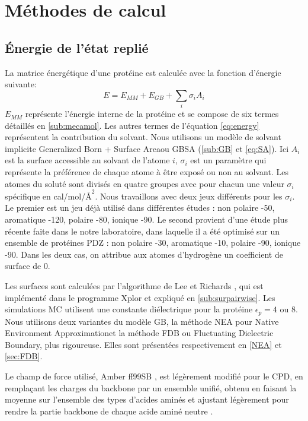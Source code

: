 \section{Méthodes de calcul}
  
\subsection{Énergie de l'état replié}
\label{sec:phia}
La matrice énergétique d'une protéine est calculée avec la fonction d'énergie suivante:
\begin{equation}
  E = E_{MM} + E_{GB} + \sum_i \sigma_iA_i
  \label{eq:energy} 
\end{equation}
$E_{MM}$ représente l'énergie interne de la protéine et se compose de six termes détaillés en \ref{sub:mecamol}. Les autres termes de l'équation \ref{eq:energy} représentent la contribution du solvant. Nous utilisons un modèle de solvant implicite \og Generalized Born + Surface Area\fg ou GBSA (\ref{sub:GB} et \ref{eq:SA}). Ici $A_i$ est la surface accessible au solvant de l'atome $i$, $\sigma_i$ est un paramètre qui représente la préférence de chaque atome à être exposé ou non au solvant. Les atomes du soluté sont divisés en quatre groupes avec pour chacun une valeur $\sigma_i$ spécifique en cal/mol/$Å^2$. Nous travaillons avec deux jeux différents pour les $\sigma_i$. Le premier est un jeu déjà utilisé dans différentes études \cite{Mignon16,Druart16b}: non polaire -50, aromatique -120, polaire -80, ionique -90. Le second provient d'une étude plus récente faite dans le notre laboratoire, dans laquelle il a été optimisé sur un ensemble de protéines PDZ \cite{Gaillard16}: non polaire -30, aromatique -10, polaire -90, ionique -90. Dans les deux cas, on attribue aux atomes d'hydrogène un coefficient de surface de 0.

Les surfaces sont calculées par l'algorithme de Lee et Richards \cite{Lee71},  qui est implémenté dans le programme Xplor \cite{Xplor} et expliqué en \ref{sub:surpairwise}. Les simulations MC utilisent une constante diélectrique pour la protéine $\epsilon_p = 4$ ou $8$.
Nous utilisons deux variantes du modèle  GB, la méthode NEA pour \og Native Environment Approximation\fg et la méthode FDB ou \og Fluctuating Dielectric Boundary\fg \cite{Villa17}, plus rigoureuse. Elles sont présentées respectivement en \ref{NEA} et \ref{sec:FDB}.

Le champ de force utilisé, Amber ff99SB \cite{Cornell95}, est légèrement modifié pour le CPD, en remplaçant les charges du backbone par un ensemble unifié, obtenu en faisant la moyenne sur l'ensemble des types d'acides aminés et ajustant légèrement pour rendre la partie backbone de chaque acide aminé neutre \cite{Aleksandrov10}.

